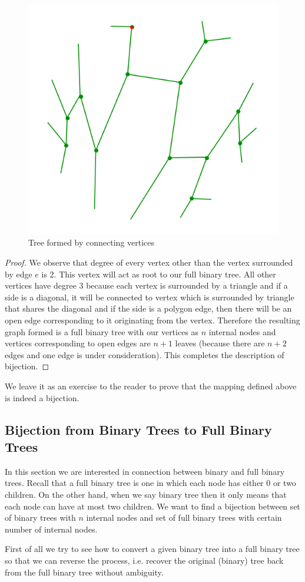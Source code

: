 \begin{figure}[h!]
    \centering
    \includegraphics[width=0.4\linewidth]{images/tree.png}
    \caption{Tree formed by connecting vertices}
    \label{fig:tree}
\end{figure}
\begin{proof}
	We observe that degree of every vertex other than the vertex surrounded by edge $e$ is 2. This vertex will act as root to our full binary tree. All other vertices have degree 3 because each vertex is surrounded by a triangle and if a side is a diagonal, it will be connected to vertex which is surrounded by triangle that shares the diagonal and if the side is a polygon edge, then there will be an open edge corresponding to it originating from the vertex. Therefore the resulting graph formed is a full binary tree with our vertices as $n$ internal nodes and vertices corresponding to open edges are $n+1$ leaves (because there are $n+2$ edges and one edge is under consideration). This completes the description of bijection.
\end{proof}

We leave it as an exercise to the reader to prove that the mapping defined above is indeed a bijection.

\subsection{Bijection from Binary Trees to Full Binary Trees}
In this section we are interested in connection between binary and full binary trees. Recall that a full binary tree is one in which each node has either 0 or two children. On the other hand, when we say binary tree then it only means that each node can have at most two children. We want to find a bijection between set of binary trees with $n$ internal nodes and set of full binary trees with certain number of internal nodes. 

First of all we try to see how to convert a given binary tree into a full binary tree so that we can reverse the process, i.e. recover the original (binary) tree back from the full binary tree without ambiguity. 

